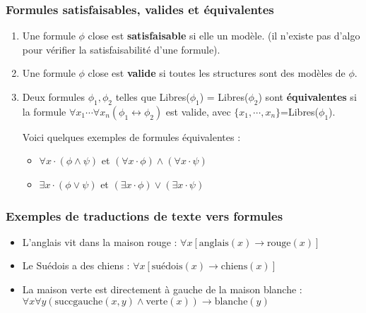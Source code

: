\subsubsection{Formules satisfaisables, valides et équivalentes}
\label{subsubsec:formules_satisfaisables_valides_équivalentes}
\begin{enumerate}
    \item Une formule $\phi$ close est \textbf{satisfaisable} si elle un modèle. (il n'existe pas d'algo pour vérifier la satisfaisabilité
    d'une formule).
    \item Une formule $\phi$ close est \textbf{valide} si toutes les structures sont des modèles de $\phi$.
    \item Deux formules $\phi_1,\phi_2$ telles que Libres($\phi_1$) = Libres($\phi_2$) sont \textbf{équivalentes} si la formule
    $\forall x_1\cdots\forall x_n(\phi_1\leftrightarrow\phi_2)$ est valide, avec $\{x_1,\cdots,x_n\}$=Libres($\phi_1$).
    \begin{example}
        Voici quelques exemples de formules équivalentes :
        \begin{itemize}[label=\textbullet]
            \item $\forall x\cdot(\phi\wedge\psi)$ et $(\forall x\cdot\phi)\wedge(\forall x\cdot\psi)$
            \item $\exists x\cdot(\phi\vee\psi)$ et $(\exists x\cdot\phi)\vee(\exists x\cdot\psi)$
        \end{itemize}
    \end{example}
\end{enumerate}

\subsubsection{Exemples de traductions de texte vers formules}
\label{subsubsec:traductions_texte_vers_formules}
\begin{itemize}[label=\textbullet]
    \item L'anglais vit dans la maison rouge : $\forall x[\text{anglais}(x)\rightarrow\text{rouge}(x)]$
    \item Le Suédois a des chiens : $\forall x[\text{suédois}(x)\rightarrow\text{chiens}(x)]$
    \item La maison verte est directement à gauche de la maison blanche : \\
    $\forall x\forall y(\text{succgauche}(x,y)\wedge\text{verte}(x))\rightarrow\text{blanche}(y)$
\end{itemize}